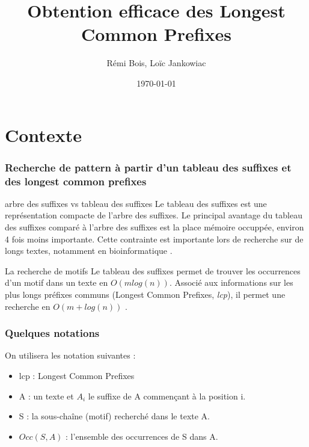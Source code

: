 \documentclass[10pt]{beamer}
\title{Obtention efficace des Longest Common Prefixes}
\author{Rémi Bois, Loïc Jankowiac}
\date{\today}
\begin{document}
\begin{frame}
  \maketitle

\end{frame}

\begin{frame}
  \tableofcontents
\end{frame}

\section{Contexte}
\label{sec:context}



\begin{frame}
  \frametitle{Recherche de pattern à partir d'un tableau des suffixes
    et des longest common prefixes}

  \begin{block}{arbre des suffixes vs tableau des suffixes} 
    Le tableau des suffixes est une représentation compacte de l'arbre
    des suffixes. Le principal avantage du tableau des suffixes comparé à
    l'arbre des suffixes est la place mémoire occuppée, environ 4 fois
    moins importante. Cette contrainte est importante lors de
    recherche sur de longs textes, notamment en bioinformatique \cite{Raffinot11}.
  \end{block}

  \pause

  \begin{block}{La recherche de motifs}
    Le tableau des suffixes permet de trouver les occurrences d'un
    motif dans un texte en $O(m log(n))$. Associé aux informations sur
    les plus longs préfixes communs (Longest Common Prefixes,
    \emph{lcp}), il permet une recherche en $O(m + log(n))$ \cite{Manber93}.
  \end{block}
  
\end{frame}

\begin{frame}
  \frametitle{Quelques notations}
  On utilisera les notation suivantes :

  \begin{itemize}
  \item lcp : Longest Common Prefixes
  \item A : un texte et $A_i$ le suffixe de A commençant à la position i.
  \item S : la sous-chaîne (motif) recherché dans le texte A.
  \item $Occ(S, A)$ : l'ensemble des occurrences de S dans A.
  \end{itemize}
\end{frame}
\end{document}
